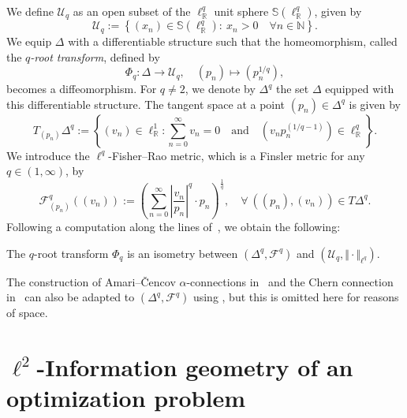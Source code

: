 \documentclass[runningheads]{llncs}
\def\RR{\mathbb{R}}
\begin{document}
We define $\mathcal{U}_q$ as an open subset of the $\ell^q_{\RR}$ unit sphere $\mathbb{S}(\ell^q_{\RR})$, given by
\[
\mathcal{U}_q := \left\{ (x_n) \in \mathbb{S}(\ell^q_{\RR}) :\ x_n > 0 \quad \forall n \in \mathbb{N} \right\}.
\]
We equip $\Delta$ with a differentiable structure such that the homeomorphism, called the \emph{$q$-root transform}, defined by
\begin{equation}\label{e: def q-root transform}
    \varPhi_q: \Delta \longrightarrow \mathcal{U}_q, \quad (p_n) \mapsto \left(p_n^{1/q}\right),
\end{equation}
becomes a diffeomorphism. For $q \neq 2$, we denote by $\Delta^q$ the set $\Delta$ equipped with this differentiable structure. The tangent space at a point $(p_n) \in \Delta^q$ is given by
\begin{equation*}\label{e: q diff structure on delta}
	T_{(p_n)}\Delta^q := \left\{ (v_n) \in \ell^1_{\mathbb{R}} : \sum_{n=0}^{\infty} v_n = 0 \quad \text{and} \quad \left(v_n p_n^{(1/q - 1)}\right) \in \ell^q_{\mathbb{R}} \right\}.
\end{equation*}
We introduce the $\ell^q$-Fisher–Rao metric, which is a Finsler metric for any $q \in (1, \infty)$, by
\begin{equation}\label{e: def q-Fisher-Rao metric}
    \mathcal{F}^q_{(p_n)}\left( (v_n) \right) := \left( \sum_{n=0}^{\infty} \left\vert \frac{v_n}{p_n} \right\vert^q \cdot p_n \right)^{\frac{1}{q}},
    \quad \forall\ ((p_n), (v_n)) \in T\Delta^q.
\end{equation}
Following a computation along the lines of~\cite[Thm.~3.12]{bauerLpFisherRaoMetricAmari2024}, we obtain the following:
\begin{theorem}\label{T: q-root transform as isom}
    The $q$-root transform $\varPhi_q$ is an isometry between $\left( \Delta^q, \mathcal{F}^q \right)$ and $\left( \mathcal{U}_q, \Vert \cdot \Vert_{\ell^q} \right)$.
\end{theorem}

\begin{remark}\label{r: alpha connections existence}
    The construction of Amari–Čencov $\alpha$-connections in~\cite[Lemma~4.1]{bauerLpFisherRaoMetricAmari2024} and the Chern connection in~\cite[Thm.~4.6]{bauerLpFisherRaoMetricAmari2024} can also be adapted to $(\Delta^q, \mathcal{F}^q)$ using , but this is omitted here for reasons of space.
\end{remark}


\section{$\ell^2$-Information geometry of an optimization problem}\label{s: 3}
\end{document}
